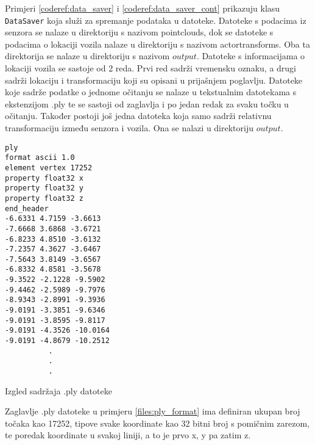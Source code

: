 Primjeri \ref{coderef:data_saver} i \ref{coderef:data_saver_cont} prikazuju klasu \texttt{DataSaver} koja služi za spremanje podataka u datoteke. Datoteke s podacima iz senzora se nalaze u direktoriju s nazivom pointclouds, dok se datoteke s podacima o lokaciji vozila nalaze u direktoriju s nazivom actortransforms. Oba ta direktorija se nalaze u direktoriju s nazivom $output$. Datoteke s informacijama o lokaciji vozila se sastoje od 2 reda. Prvi red sadrži vremensku oznaku, a drugi sadrži lokaciju i transformaciju koji su opisani u prijašnjem poglavlju. Datoteke koje sadrže podatke o jednome očitanju se nalaze u tekstualnim datotekama s ekstenzijom .ply te se sastoji od zaglavlja i po jedan redak za svaku točku u očitanju. Također postoji još jedna datoteka koja samo sadrži relativnu transformaciju između senzora i vozila. Ona se nalazi u direktoriju $output$.

\begin{listing}[h!]
  \begin{verbatim}
ply
format ascii 1.0
element vertex 17252
property float32 x
property float32 y
property float32 z
end_header
-6.6331 4.7159 -3.6613
-7.6668 3.6868 -3.6721
-6.8233 4.8510 -3.6132
-7.2357 4.3627 -3.6467
-7.5643 3.8149 -3.6567
-6.8332 4.8581 -3.5678
-9.3522 -2.1228 -9.5902
-9.4462 -2.5989 -9.7976
-8.9343 -2.8991 -9.3936
-9.0191 -3.3851 -9.6346
-9.0191 -3.8595 -9.8117
-9.0191 -4.3526 -10.0164
-9.0191 -4.8679 -10.2512
          .
          .
          .
  \end{verbatim}
  \caption{Izgled sadržaja .ply datoteke}
  \label{files:ply_format}
\end{listing}

Zaglavlje .ply datoteke u primjeru \ref{files:ply_format} ima definiran ukupan broj točaka kao 17252, tipove svake koordinate kao 32 bitni broj s pomičnim zarezom, te poredak koordinate u svakoj liniji, a to je prvo x, y pa zatim z.